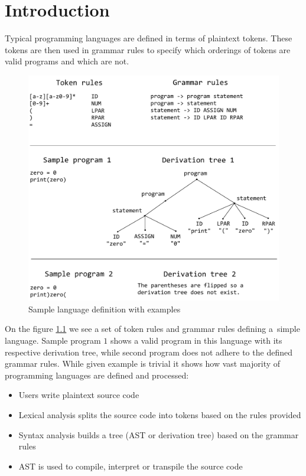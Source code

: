 \chapter{Introduction}

Typical programming languages are defined in terms of plaintext tokens. These tokens
are then used in grammar rules to specify which orderings of tokens are valid programs and
which are not.
\begin{figure}[!hbt]
	\includegraphics[width=\textwidth]{../img/tokens_and_grammar}
	\caption{Sample language definition with examples}
	\label{fig:chap1:tokens_and_grammar}
\end{figure}

On the figure \ref{fig:chap1:tokens_and_grammar} we see a set of token rules and grammar rules defining a~simple
language. Sample program $1$ shows a valid program in this language with its respective derivation tree, while
second program does not adhere to the defined grammar rules.
While given example is trivial it shows how vast majority of programming languages are defined and processed:
\begin{itemize}
\item Users write plaintext source code
\item Lexical analysis splits the source code into tokens based on the rules provided
\item Syntax analysis builds a tree (AST or derivation tree) based on the grammar rules
\item AST is used to compile, interpret or transpile the source code
\end{itemize}

